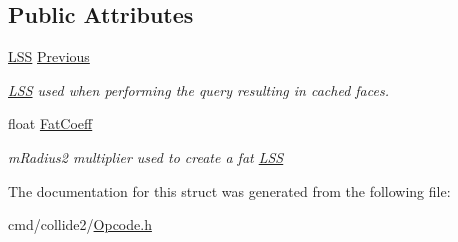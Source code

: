 \subsection*{Public Attributes}
\begin{DoxyCompactItemize}
\item 
\hyperlink{classOpcode_1_1LSS}{L\+SS} \hyperlink{structOpcode_1_1LSSCache_af7d078e1c1ff23177f60d8af9b0aa5bc}{Previous}\hypertarget{structOpcode_1_1LSSCache_af7d078e1c1ff23177f60d8af9b0aa5bc}{}\label{structOpcode_1_1LSSCache_af7d078e1c1ff23177f60d8af9b0aa5bc}

\begin{DoxyCompactList}\small\item\em \hyperlink{classOpcode_1_1LSS}{L\+SS} used when performing the query resulting in cached faces. \end{DoxyCompactList}\item 
float \hyperlink{structOpcode_1_1LSSCache_a9ece592d89d01b4816526b15bc56da2b}{Fat\+Coeff}\hypertarget{structOpcode_1_1LSSCache_a9ece592d89d01b4816526b15bc56da2b}{}\label{structOpcode_1_1LSSCache_a9ece592d89d01b4816526b15bc56da2b}

\begin{DoxyCompactList}\small\item\em m\+Radius2 multiplier used to create a fat \hyperlink{classOpcode_1_1LSS}{L\+SS} \end{DoxyCompactList}\end{DoxyCompactItemize}


The documentation for this struct was generated from the following file\+:\begin{DoxyCompactItemize}
\item 
cmd/collide2/\hyperlink{Opcode_8h}{Opcode.\+h}\end{DoxyCompactItemize}
